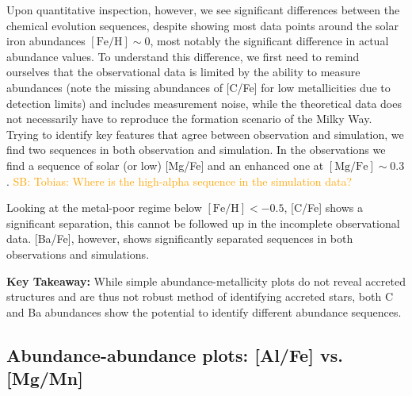 \documentclass[fleqn,usenatbib]{mnras}
\newcommand{\SB}[1]{{\textcolor{orange}{SB: #1}}}
\begin{document}
Upon quantitative inspection, however, we see significant differences between the chemical evolution sequences, despite showing most data points around the solar iron abundances $\mathrm{[Fe/H]} \sim 0$, most notably the significant difference in actual abundance values. To understand this difference, we first need to remind ourselves that the observational data is limited by the ability to measure abundances (note the missing abundances of [C/Fe] for low metallicities due to detection limits) and includes measurement noise, while the theoretical data does not necessarily have to reproduce the formation scenario of the Milky Way. Trying to identify key features that agree between observation and simulation, we find two sequences in both observation and simulation. In the observations we find a sequence of solar (or low) [Mg/Fe] and an enhanced one at $\mathrm{[Mg/Fe] \sim 0.3}$. \SB{Tobias: Where is the high-alpha sequence in the simulation data?}

Looking at the metal-poor regime below $\mathrm{[Fe/H]} < -0.5$, [C/Fe] shows a significant separation, this cannot be followed up in the incomplete observational data. [Ba/Fe], however, shows significantly separated sequences in both observations and simulations.

\textbf{Key Takeaway:} While simple abundance-metallicity plots do not reveal accreted structures and are thus not robust method of identifying accreted stars, both C and Ba abundances show the potential to identify different abundance sequences.



\subsection{Abundance-abundance plots: [Al/Fe] vs. [Mg/Mn]} \label{sec:alfe_mgmn}
\end{document}
